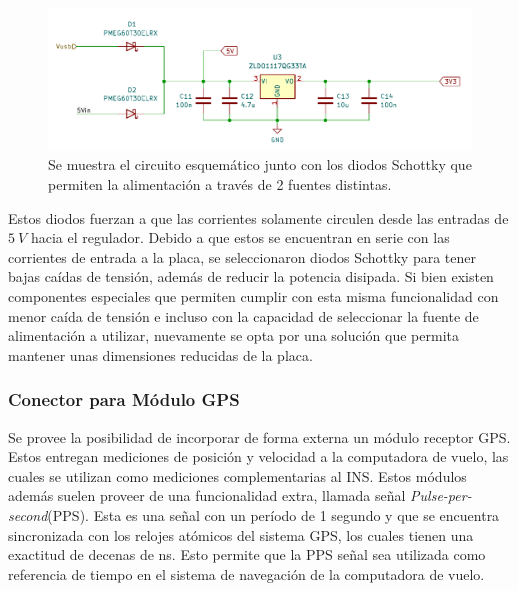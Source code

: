 \begin{figure}[htb]
    \centering
    \includegraphics[width=\textwidth]{img/diode_oring.png}
    \caption{Se muestra el circuito esquemático junto con los diodos Schottky que permiten la alimentación a través de 2 fuentes distintas.}
    \label{fig:diode_oring}    
\end{figure}

Estos diodos fuerzan a que las corrientes solamente circulen desde las entradas de $5 \ V$ hacia el regulador. Debido a que estos se encuentran en serie con las corrientes de entrada a la placa, se seleccionaron diodos Schottky para tener bajas caídas de tensión, además de reducir la potencia disipada. %
Si bien existen componentes especiales que permiten cumplir con esta misma funcionalidad con menor caída de tensión e incluso con la capacidad de seleccionar la fuente de alimentación a utilizar, nuevamente se opta por una solución que permita mantener unas dimensiones reducidas de la placa.


\subsubsection{Conector para Módulo GPS}

Se provee la posibilidad de incorporar de forma externa un módulo receptor GPS. Estos entregan mediciones de posición y velocidad a la computadora de vuelo, las cuales se utilizan como mediciones complementarias al INS. Estos módulos además suelen proveer de una funcionalidad extra, llamada señal \textit{Pulse-per-second}(PPS). Esta es una señal con un período de 1 segundo y que se encuentra sincronizada con los relojes atómicos del sistema GPS, los cuales tienen una exactitud de decenas de ns. Esto permite que la PPS señal sea utilizada como referencia de tiempo en el sistema de navegación de la computadora de vuelo.

